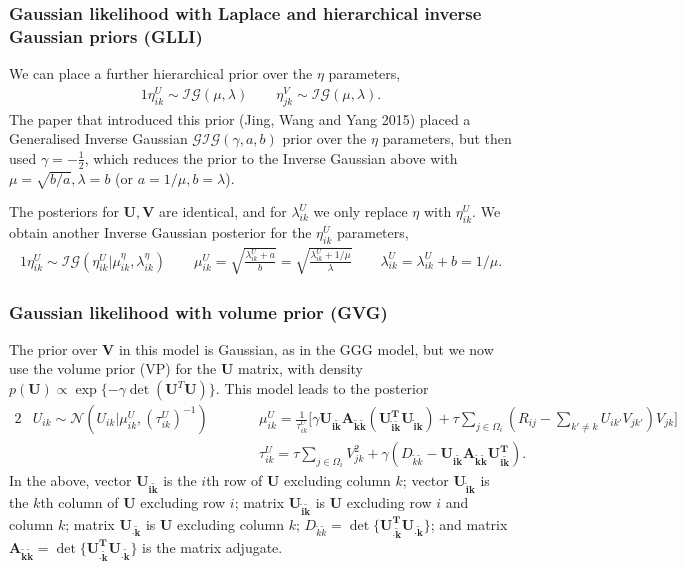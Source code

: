 \documentclass{article}
\newcommand{\U}{\boldsymbol U}
\newcommand{\V}{\boldsymbol V}
\newcommand{\lambdaUik}{\lambda_{ik}^U}
\newcommand{\sumOmegai}{\sum_{j \in \Omega_i}}
\newcommand{\sumexclk}{\sum_{k' \neq k}}
\newcommand{\diffexclk}{( R_{ij} - \sumexclk U_{ik'} V_{jk'} ) }
\begin{document}
		\subsubsection{Gaussian likelihood with Laplace and hierarchical inverse Gaussian priors (GLLI)}
		We can place a further hierarchical prior over the $\eta$ parameters, 
		\begin{alignat*}{1}
			\eta^U_{ik} \sim \mathcal{IG}(\mu, \lambda)  
			\quad\quad \eta^V_{jk} \sim \mathcal{IG}(\mu, \lambda).
		\end{alignat*}
		The paper that introduced this prior (Jing, Wang and Yang 2015) placed a Generalised Inverse Gaussian $\mathcal{GIG}(\gamma, a, b)$ prior over the $\eta$ parameters, but then used $\gamma = -\frac{1}{2}$, which reduces the prior to the Inverse Gaussian above with $\mu=\sqrt{b/a}, \lambda=b$ (or $a=1/\mu, b=\lambda$).
		
		The posteriors for $\U, \V$ are identical, and for $\lambdaUik$ we only replace $\eta$ with $\eta^U_{ik}$. We obtain another Inverse Gaussian posterior for the $\eta^U_{ik}$ parameters,
		\begin{alignat*}{1}
			\eta^U_{ik} \sim \mathcal{IG} (\eta^U_{ik} | \mu^{\eta}_{ik}, \lambda^{\eta}_{ik} )
			\quad\quad \mu^U_{ik} = \sqrt{\frac{\lambdaUik + a}{b}} = \sqrt{\frac{\lambdaUik + 1/\mu}{\lambda}}
			\quad\quad \lambda^U_{ik} = \lambdaUik + b = 1/\mu.
		\end{alignat*}
		
		\subsubsection{Gaussian likelihood with volume prior (GVG)}
		The prior over $\V$ in this model is Gaussian, as in the GGG model, but we now use the volume prior (VP) for the $\U$ matrix, with density $p(\U) \propto \exp \lbrace - \gamma \det (\U^T \U) \rbrace $. This model leads to the posterior 
		\begin{alignat*}{2}
			&U_{ik} \sim \mathcal{N} (U_{ik} | \mu^U_{ik}, (\tau^U_{ik})^{-1} )
			\quad\quad &&\mu^U_{ik} = \frac{1}{\tau^U_{ik}} \Bigg[ \gamma \boldsymbol{U_{i\tilde{k}}} \boldsymbol{A_{\tilde{k}\tilde{k}}} ( \boldsymbol{U_{\tilde{i}\tilde{k}}^T} \boldsymbol{U_{\tilde{i}k}} ) + \tau \sumOmegai \diffexclk V_{jk} \Bigg] \\
			& &&\tau^U_{ik} = \tau \sumOmegai V_{jk}^2 + \gamma ( D_{\tilde{k}\tilde{k}} - \boldsymbol{U_{i\tilde{k}}} \boldsymbol{A_{\tilde{k}\tilde{k}}} \boldsymbol{U_{i\tilde{k}}^T} ).
		\end{alignat*}
		In the above, vector $ \boldsymbol{U_{i\tilde{k}}} $ is the $i$th row of $\U$ excluding column $k$; vector $ \boldsymbol{U_{\tilde{i}k}} $ is the $k$th column of $\U$ excluding row $i$; matrix $ \boldsymbol{U_{\tilde{i}\tilde{k}}} $ is $\U$ excluding row $i$ and column $k$; matrix $ \boldsymbol{U_{\cdot \tilde{k}}} $ is $\U$ excluding column $k$; $D_{\tilde{k}\tilde{k}} = \det \lbrace \boldsymbol{U_{\cdot \tilde{k}}^T} \boldsymbol{U_{\cdot \tilde{k}}} \rbrace $; and matrix $\boldsymbol{A_{\tilde{k}\tilde{k}}} = \det \lbrace \boldsymbol{U_{\cdot \tilde{k}}^T} \boldsymbol{U_{\cdot \tilde{k}}} \rbrace $ is the matrix adjugate.
		
\end{document}
